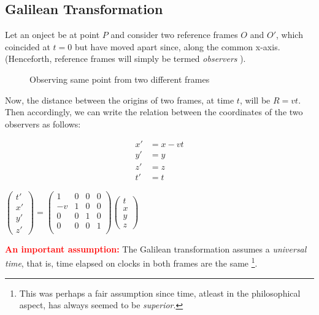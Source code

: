 \subsection*{Galilean Transformation}
Let an onject be at point $P$ and consider two reference frames $O$ and $O'$, which coincided at $t=0$ but have moved apart since, along the common x-axis. (Henceforth, reference frames will simply be termed \textit{observers} ).
\begin{figure}[H]
    \centering 
    
    \caption{Observing same point from two different frames}
    \label{fig:gal_rel}
\end{figure}
\noindent
Now, the distance between the origins of two frames, at time $t$, will be $R = vt$. Then accordingly, we can write the relation between the coordinates of the two observers as follows:
   \begin{center}
     \begin{minipage}{0.5\textwidth}
    \begin{align*}
        x' &= x-vt\\
        y'&=y\\
        z' &=z \\
        t'&=t
    \end{align*}
\end{minipage}\hfill
\begin{minipage}{0.5\textwidth}
    
    
    $\begin{pmatrix}
        t'\\x'\\y'\\z'
    \end{pmatrix} = \begin{pmatrix}
        1&0&0&0 \\
        -v&1&0&0 \\
        0&0&1&0 \\
        0&0&0&1 \\
    \end{pmatrix}    \begin{pmatrix}
        t\\x\\y\\z
    \end{pmatrix}$
\end{minipage}
   \end{center}
\textcolor{red}{\textbf{An important assumption:}} The Galilean transformation assumes a \textit{universal time}, that is, time elapsed on clocks in both frames are the same \footnote{This was perhaps a fair assumption since time, atleast in the philosophical aspect, has always seemed to be \textit{superior}. }.\\[0.2cm]
